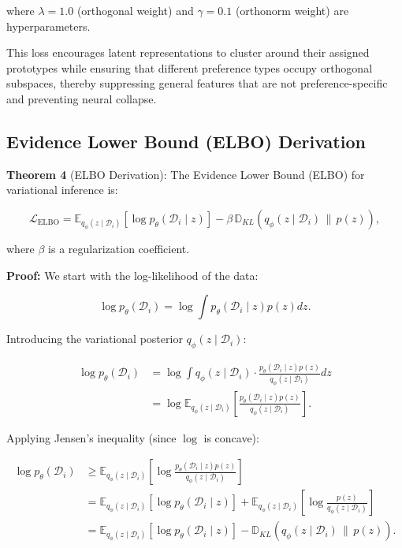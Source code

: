 where $\lambda = 1.0$ (orthogonal weight) and $\gamma = 0.1$ (orthonorm weight) are hyperparameters.

This loss encourages latent representations to cluster around their assigned prototypes while ensuring that different preference types occupy orthogonal subspaces, thereby suppressing general features that are not preference-specific and preventing neural collapse.

\subsection{Evidence Lower Bound (ELBO) Derivation}

\textbf{Theorem 4} (ELBO Derivation): The Evidence Lower Bound (ELBO) for variational inference is:

\begin{equation}
\mathcal{L}_{\text{ELBO}} = \mathbb{E}_{q_\phi(z \mid \mathcal{D}_i)} \left[ \log p_\theta(\mathcal{D}_i \mid z) \right] - \beta \,\mathbb{D}_{KL}(q_\phi(z \mid \mathcal{D}_i) \,\|\, p(z)),
\end{equation}

where $\beta$ is a regularization coefficient.

\textbf{Proof:} We start with the log-likelihood of the data:

\begin{equation}
\log p_\theta(\mathcal{D}_i) = \log \int p_\theta(\mathcal{D}_i \mid z) p(z) dz.
\end{equation}

Introducing the variational posterior $q_\phi(z \mid \mathcal{D}_i)$:

\begin{align}
\log p_\theta(\mathcal{D}_i) &= \log \int q_\phi(z \mid \mathcal{D}_i) \cdot \frac{p_\theta(\mathcal{D}_i \mid z) p(z)}{q_\phi(z \mid \mathcal{D}_i)} dz \nonumber \\
&= \log \mathbb{E}_{q_\phi(z \mid \mathcal{D}_i)} \left[ \frac{p_\theta(\mathcal{D}_i \mid z) p(z)}{q_\phi(z \mid \mathcal{D}_i)} \right].
\end{align}

Applying Jensen's inequality (since $\log$ is concave):

\begin{align}
\log p_\theta(\mathcal{D}_i) &\geq \mathbb{E}_{q_\phi(z \mid \mathcal{D}_i)} \left[ \log \frac{p_\theta(\mathcal{D}_i \mid z) p(z)}{q_\phi(z \mid \mathcal{D}_i)} \right] \nonumber \\
&= \mathbb{E}_{q_\phi(z \mid \mathcal{D}_i)} \left[ \log p_\theta(\mathcal{D}_i \mid z) \right] + \mathbb{E}_{q_\phi(z \mid \mathcal{D}_i)} \left[ \log \frac{p(z)}{q_\phi(z \mid \mathcal{D}_i)} \right] \nonumber \\
&= \mathbb{E}_{q_\phi(z \mid \mathcal{D}_i)} \left[ \log p_\theta(\mathcal{D}_i \mid z) \right] - \mathbb{D}_{KL}(q_\phi(z \mid \mathcal{D}_i) \,\|\, p(z)).
\end{align}

